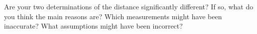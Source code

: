 Are your two determinations of the distance significantly
different?  If so, what do you think the main reasons are?  Which
measurements might have been inaccurate?  What assumptions might
have been incorrect?

\vskip 2in

%
%
%
%
%
%
%
%
%
%
%
%
%
%
